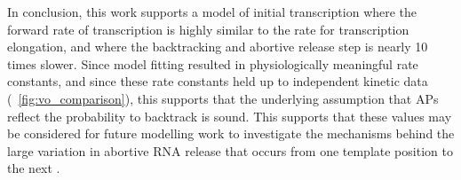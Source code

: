 In conclusion, this work supports a model of initial transcription where the
forward rate of transcription is highly similar to the rate for transcription
elongation, and where the backtracking and abortive release step is nearly 10
times slower. Since model fitting resulted in physiologically meaningful rate
constants, and since these rate constants held up to independent kinetic data
(\FIG~\ref{fig:vo_comparison}), this supports that the underlying assumption
that APs reflect the probability to backtrack is sound. This supports that
these values may be considered for future modelling work to investigate the
mechanisms behind the large variation in abortive RNA release that occurs
from one template position to the next \cite{hsu_initial_2006}.
